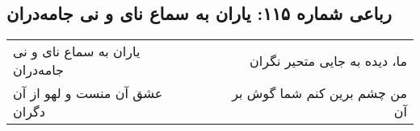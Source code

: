 \begin{center}
\section*{رباعی شماره ۱۱۵: یاران به سماع نای و نی جامه‌دران}
\label{sec:115}
\begin{longtable}{l p{0.5cm} r}
یاران به سماع نای و نی جامه‌دران
&&
ما، دیده به جایی متحیر نگران
\\
عشق آن منست و لهو از آن دگران
&&
من چشم برین کنم شما گوش بر آن
\\
\end{longtable}
\end{center}
